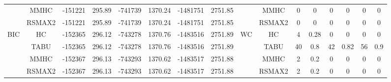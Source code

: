 \begin{table}[h]
{\begin{tabular}{cc||cc|cc|cc||cc|cc|cc|cc}
& MMHC &	-151221 & 	295.89 & 	-741739 & 	1370.24 & 	-1481751 & 	2751.85 & 	& MMHC &	0 & 	0 & 	0 & 	0 & 	0 & 	0\tabularnewline													
& RSMAX2 &	-151221 & 	295.89 & 	-741739 & 	1370.24 & 	-1481751 & 	2751.85 & 	& RSMAX2 &	0 & 	0 & 	0 & 	0 & 	0 & 	0\tabularnewline													
\hline																										
\multirow{4}{*}{BIC} & HC &	-152365 & 	296.12 & 	-743278 & 	1370.76 & 	-1483516 & 	2751.89 & 	\multirow{4}{*}{WC} & HC &	4 & 	0.28 & 	0 & 	0 & 	0 & 	0\tabularnewline													
& TABU &	-152365 & 	296.12 & 	-743278 & 	1370.76 & 	-1483516 & 	2751.89 & 	& TABU &	40 & 	0.8 & 	42 & 	0.82 & 	56 & 	0.9\tabularnewline													
& MMHC &	-152367 & 	296.13 & 	-743293 & 	1370.62 & 	-1483517 & 	2751.88 & 	& MMHC &	2 & 	0.2 & 	0 & 	0 & 	0 & 	0\tabularnewline													
& RSMAX2 &	-152367 & 	296.13 & 	-743293 & 	1370.62 & 	-1483517 & 	2751.88 & 	& RSMAX2 &	2 & 	0.2 & 	0 & 	0 & 	0 & 	0\tabularnewline													
\hline																										
\end{tabular}																										
}																										
\end{table}																										


